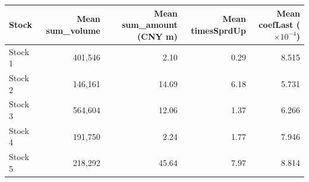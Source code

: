 \begin{tabular}{lrrrr}
\toprule
Stock & Mean sum\_volume & Mean sum\_amount (CNY m) & Mean timesSprdUp & Mean coefLast ($\times10^{-4}$) \\
\midrule
Stock 1 & 401{,}546 & 2.10 & 0.29 & 8.515 \\
Stock 2 & 146{,}161 & 14.69 & 6.18 & 5.731 \\
Stock 3 & 564{,}604 & 12.06 & 1.37 & 6.266 \\
Stock 4 & 191{,}750 & 2.24 & 1.77 & 7.946 \\
Stock 5 & 218{,}292 & 45.64 & 7.97 & 8.814 \\
\bottomrule
\end{tabular}
